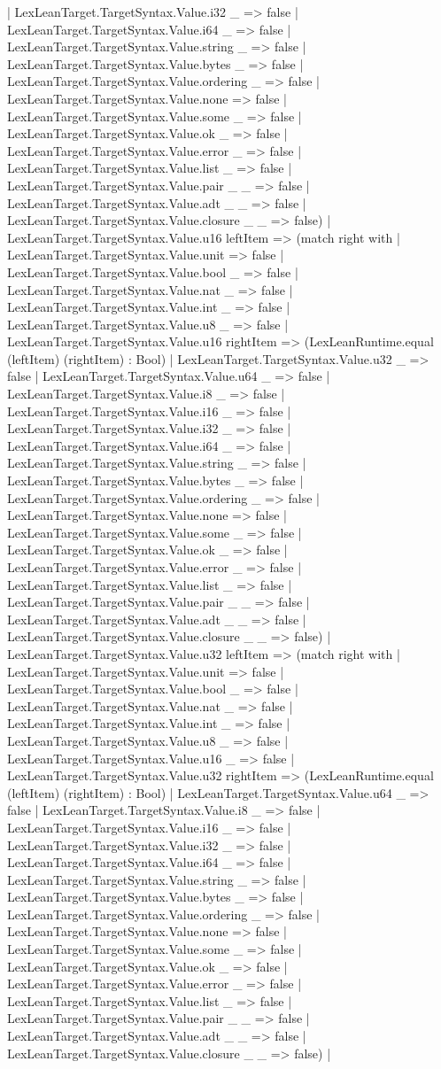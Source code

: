 \documentclass[11pt]{article}
\begin{document}
| LexLeanTarget.TargetSyntax.Value.i32 \_ => false | LexLeanTarget.TargetSyntax.Value.i64 \_ => false | LexLeanTarget.TargetSyntax.Value.string \_ => false | LexLeanTarget.TargetSyntax.Value.bytes \_ => false | LexLeanTarget.TargetSyntax.Value.ordering \_ => false | LexLeanTarget.TargetSyntax.Value.none => false | LexLeanTarget.TargetSyntax.Value.some \_ => false | LexLeanTarget.TargetSyntax.Value.ok \_ => false | LexLeanTarget.TargetSyntax.Value.error \_ => false | LexLeanTarget.TargetSyntax.Value.list \_ => false | LexLeanTarget.TargetSyntax.Value.pair \_ \_ => false | LexLeanTarget.TargetSyntax.Value.adt \_ \_ => false | LexLeanTarget.TargetSyntax.Value.closure \_ \_ => false) | LexLeanTarget.TargetSyntax.Value.u16 leftItem => (match right with | LexLeanTarget.TargetSyntax.Value.unit => false | LexLeanTarget.TargetSyntax.Value.bool \_ => false | LexLeanTarget.TargetSyntax.Value.nat \_ => false | LexLeanTarget.TargetSyntax.Value.int \_ => false | LexLeanTarget.TargetSyntax.Value.u8 \_ => false | LexLeanTarget.TargetSyntax.Value.u16 rightItem => (LexLeanRuntime.equal (leftItem) (rightItem) : Bool) | LexLeanTarget.TargetSyntax.Value.u32 \_ => false | LexLeanTarget.TargetSyntax.Value.u64 \_ => false | LexLeanTarget.TargetSyntax.Value.i8 \_ => false | LexLeanTarget.TargetSyntax.Value.i16 \_ => false | LexLeanTarget.TargetSyntax.Value.i32 \_ => false | LexLeanTarget.TargetSyntax.Value.i64 \_ => false | LexLeanTarget.TargetSyntax.Value.string \_ => false | LexLeanTarget.TargetSyntax.Value.bytes \_ => false | LexLeanTarget.TargetSyntax.Value.ordering \_ => false | LexLeanTarget.TargetSyntax.Value.none => false | LexLeanTarget.TargetSyntax.Value.some \_ => false | LexLeanTarget.TargetSyntax.Value.ok \_ => false | LexLeanTarget.TargetSyntax.Value.error \_ => false | LexLeanTarget.TargetSyntax.Value.list \_ => false | LexLeanTarget.TargetSyntax.Value.pair \_ \_ => false | LexLeanTarget.TargetSyntax.Value.adt \_ \_ => false | LexLeanTarget.TargetSyntax.Value.closure \_ \_ => false) | LexLeanTarget.TargetSyntax.Value.u32 leftItem => (match right with | LexLeanTarget.TargetSyntax.Value.unit => false | LexLeanTarget.TargetSyntax.Value.bool \_ => false | LexLeanTarget.TargetSyntax.Value.nat \_ => false | LexLeanTarget.TargetSyntax.Value.int \_ => false | LexLeanTarget.TargetSyntax.Value.u8 \_ => false | LexLeanTarget.TargetSyntax.Value.u16 \_ => false | LexLeanTarget.TargetSyntax.Value.u32 rightItem => (LexLeanRuntime.equal (leftItem) (rightItem) : Bool) | LexLeanTarget.TargetSyntax.Value.u64 \_ => false | LexLeanTarget.TargetSyntax.Value.i8 \_ => false | LexLeanTarget.TargetSyntax.Value.i16 \_ => false | LexLeanTarget.TargetSyntax.Value.i32 \_ => false | LexLeanTarget.TargetSyntax.Value.i64 \_ => false | LexLeanTarget.TargetSyntax.Value.string \_ => false | LexLeanTarget.TargetSyntax.Value.bytes \_ => false | LexLeanTarget.TargetSyntax.Value.ordering \_ => false | LexLeanTarget.TargetSyntax.Value.none => false | LexLeanTarget.TargetSyntax.Value.some \_ => false | LexLeanTarget.TargetSyntax.Value.ok \_ => false | LexLeanTarget.TargetSyntax.Value.error \_ => false | LexLeanTarget.TargetSyntax.Value.list \_ => false | LexLeanTarget.TargetSyntax.Value.pair \_ \_ => false | LexLeanTarget.TargetSyntax.Value.adt \_ \_ => false | LexLeanTarget.TargetSyntax.Value.closure \_ \_ => false) | 
\end{document}
